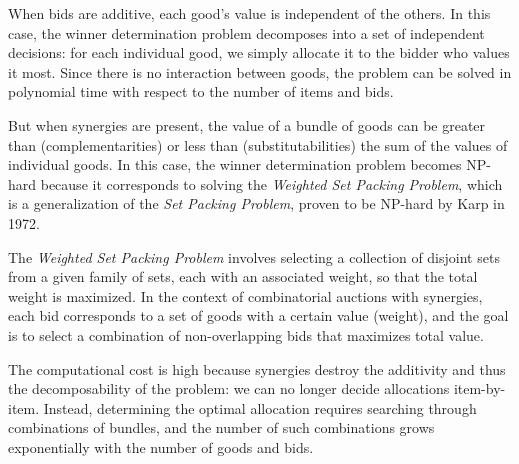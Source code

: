 \documentclass[10pt]{article}
\begin{document}
When bids are additive, each good's value is independent of the others. In this case, the winner determination problem decomposes into a set of independent decisions: for each individual good, we simply allocate it to the bidder who values it most. Since there is no interaction between goods, the problem can be solved in polynomial time with respect to the number of items and bids.

But when synergies are present, the value of a bundle of goods can be greater than (complementarities) or less than (substitutabilities) the sum of the values of individual goods. In this case, the winner determination problem becomes NP-hard because it corresponds to solving the \textit{Weighted Set Packing Problem}, which is a generalization of the \textit{Set Packing Problem}, proven to be NP-hard by Karp in 1972.

The \textit{Weighted Set Packing Problem} involves selecting a collection of disjoint sets from a given family of sets, each with an associated weight, so that the total weight is maximized. In the context of combinatorial auctions with synergies, each bid corresponds to a set of goods with a certain value (weight), and the goal is to select a combination of non-overlapping bids that maximizes total value.

The computational cost is high because synergies destroy the additivity and thus the decomposability of the problem: we can no longer decide allocations item-by-item. Instead, determining the optimal allocation requires searching through combinations of bundles, and the number of such combinations grows exponentially with the number of goods and bids.
\end{document}
